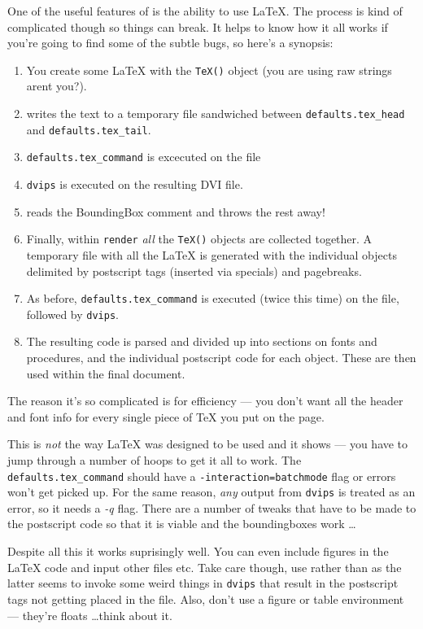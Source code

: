 \documentclass[a4paper]{book}
\begin{document}
One of the useful features of \pyscript{} is the ability to use \LaTeX.
The process is kind of complicated though so things can break. It helps
to know how it all works if you're going to find some of the subtle bugs,
so here's a synopsis:
\begin{enumerate}
\item You create some \LaTeX{} with the \Verb|TeX()| object (you are using
  raw strings arent you?).
\item \pyscript{} writes the text to a temporary file sandwiched
  between \Verb|defaults.tex_head| and \Verb|defaults.tex_tail|. 
\item \Verb|defaults.tex_command| is excecuted on the file
\item \Verb|dvips| is executed on the resulting DVI file.
\item \pyscript{} reads the BoundingBox comment and throws the rest away!
\item Finally, within \Verb|render| \emph{all} the \Verb|TeX()|
  objects are collected together. A temporary file with all the \LaTeX{}
  is generated with the individual objects delimited by postscript
  tags (inserted via specials) and pagebreaks.
\item As before, \Verb|defaults.tex_command| is executed (twice this
  time) on the file, followed by \Verb|dvips|.
\item The resulting code is parsed and divided up into sections on
  fonts and procedures, and the individual postscript code for each
  object. These are then used within the final document.
\end{enumerate}
The reason it's so complicated is for efficiency --- you don't want all the
header and font info for every single piece of \TeX{} you put on the page.

This is \emph{not} the way \LaTeX{} was designed to be used and it
shows --- you have to jump through a number of hoops to get it all to
work. The \Verb|defaults.tex_command| should have a
\Verb|-interaction=batchmode| flag or errors won't get picked up. For
the same reason, \emph{any} output from \Verb|dvips| is treated as an
error, so it needs a \emph{-q} flag. There are a number of tweaks that
have to be made to the postscript code so that it is viable and the
boundingboxes work \ldots

Despite all this it works suprisingly well. You can even include
figures in the \LaTeX{} code and input other files etc. Take care
though, use \Verb|| rather than \Verb|| as the latter
seems to invoke some weird things in \Verb|dvips| that result in the
postscript tags not getting placed in the file. Also, don't use a figure
or table environment --- they're floats \ldots think about it.
\end{document}

